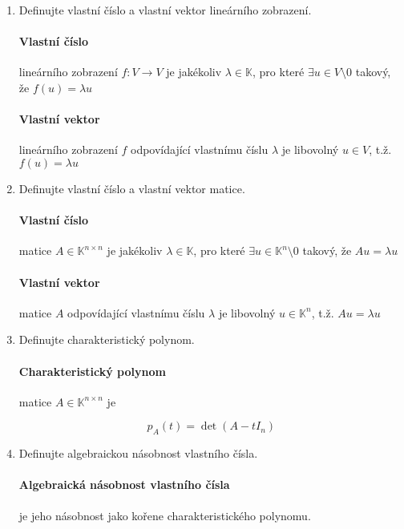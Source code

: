 \documentclass[10pt,a4paper]{article}
\theoremstyle{plain}
\begin{document}
\begin{enumerate}
\item Definujte vlastní číslo a vlastní vektor lineárního zobrazení.

\paragraph{Vlastní číslo} lineárního zobrazení $f: V \to V$ je jakékoliv $\lambda \in \mathbb{K}$, pro které $\exists u \in V \setminus 0$ takový, že $f(u) = \lambda u$

\paragraph{Vlastní vektor} lineárního zobrazení $f$ odpovídající vlastnímu číslu $\lambda$ je libovolný $u \in V$, t.ž. $f(u) = \lambda u$

\item Definujte vlastní číslo a vlastní vektor matice.

\paragraph{Vlastní číslo} matice $A \in \mathbb{K}^{n \times n}$ je jakékoliv $\lambda \in \mathbb{K}$, pro které $\exists u \in \mathbb{K}^n \setminus 0$ takový, že $Au = \lambda u$

\paragraph{Vlastní vektor} matice $A$ odpovídající vlastnímu číslu $\lambda$ je libovolný $u \in \mathbb{K}^n$, t.ž. $Au = \lambda u$

\item Definujte charakteristický polynom.
 
\paragraph{Charakteristický polynom} matice $A \in \mathbb{K}^{n \times n}$ je

\[ p_A(t) = \det(A - tI_n)\]


\item Definujte algebraickou násobnost vlastního čísla.

\paragraph{Algebraická násobnost vlastního čísla} je jeho násobnost jako kořene charakteristického polynomu.


\end{enumerate}
\end{document}
